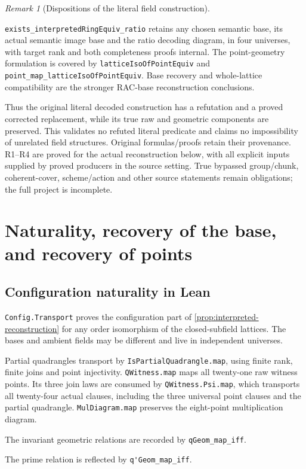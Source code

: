\documentclass[11pt,oneside]{article}
\theoremstyle{definition}
\theoremstyle{remark}
\newtheorem{remark}[theorem]{Remark}
\newcommand{\lean}[1]{\nolinkurl{#1}}
\begin{document}
\begin{remark}[Dispositions of the literal field construction]
\begin{itemize}
\lean{exists_interpretedRingEquiv_ratio} retains any chosen semantic base, its actual
semantic image base and the ratio decoding diagram, in four universes, with target rank
and both completeness proofs internal. The point-geometry formulation is covered by
\lean{latticeIsoOfPointEquiv} and \lean{point_map_latticeIsoOfPointEquiv}. Base recovery
and whole-lattice compatibility are the stronger RAC-base reconstruction conclusions.
\end{itemize}
Thus the original literal decoded construction has a refutation and a proved corrected
replacement, while its true raw and geometric components are preserved. This validates
no refuted literal predicate and claims no impossibility of unrelated field structures.
Original formulas/proofs retain their provenance. R1--R4 are proved for the actual
reconstruction below, with all explicit inputs supplied by proved producers in the source
setting. True bypassed group/chunk, coherent-cover, scheme/action and other source
statements remain obligations; the full project is incomplete.
\end{remark}

\section{Naturality, recovery of the base, and recovery of points}

\subsection{Configuration naturality in Lean}

\lean{Config.Transport} proves the configuration part of
\cref{prop:interpreted-reconstruction} for any order isomorphism of the closed-subfield
lattices. The bases and ambient fields may be different and live in independent universes.

Partial quadrangles transport by \lean{IsPartialQuadrangle.map}, using finite rank,
finite joins and point injectivity. \lean{QWitness.map} maps all twenty-one raw witness
points. Its three join laws are consumed by \lean{QWitness.Psi.map}, which transports
all twenty-four actual clauses, including the three universal point clauses and the
partial quadrangle. \lean{MulDiagram.map} preserves the eight-point multiplication diagram.

The invariant geometric relations are recorded by \lean{qGeom_map_iff}.

The prime relation is reflected by \lean{q'Geom_map_iff}.
\end{document}
